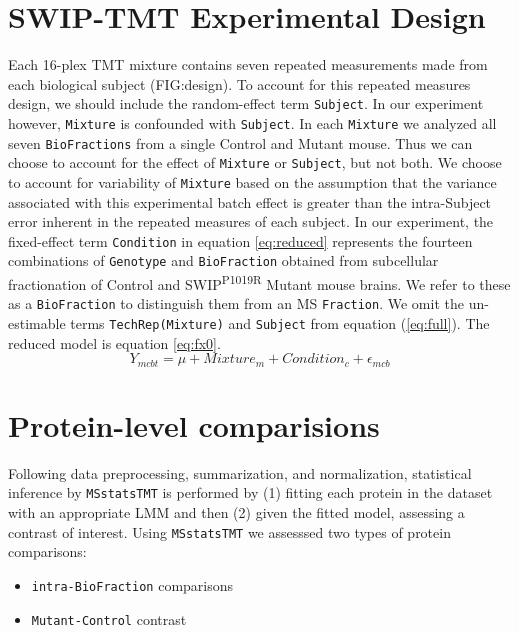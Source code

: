\documentclass[11pt]{elife}
\begin{document}
\section{SWIP-TMT Experimental Design}

Each 16-plex TMT mixture contains seven repeated measurements made from each
biological subject (FIG:design).  To account for this repeated measures
design, we should include the random-effect term \texttt{Subject}.
In our experiment however, \texttt{Mixture} is confounded with \texttt{Subject}.
In each \texttt{Mixture} we analyzed all seven \texttt{BioFractions} from a
single Control and Mutant mouse. Thus we can choose to
account for the effect of \texttt{Mixture} or \texttt{Subject}, but not both. We
choose to account for variability of \texttt{Mixture} based on the assumption
that the variance associated with this experimental batch effect is greater than
the intra-Subject error inherent in the repeated measures of each subject.
In our experiment, the fixed-effect term \texttt{Condition} in equation
\ref{eq:reduced} represents the fourteen combinations of \texttt{Genotype} and
\texttt{BioFraction} obtained from subcellular fractionation of Control and
SWIP\textsuperscript{P1019R} Mutant mouse brains. We refer to these as a
\texttt{BioFraction} to distinguish them from an MS \texttt{Fraction}. 
We omit the un-estimable terms \texttt{TechRep(Mixture)} and \texttt{Subject}
from equation (\ref{eq:full}). The reduced model is equation \ref{eq:fx0}.
\begin{equation}
	\label{eq:fx0}
	Y_{mcbt} = \mu + Mixture_m + Condition_c + \epsilon_{mcb}
\end{equation}


\section{Protein-level comparisions}

Following data preprocessing, summarization, and normalization, statistical
inference by \texttt{MSstatsTMT} is performed by (1) fitting each protein in the
dataset with an appropriate LMM and then (2) given the fitted model, assessing a
contrast of interest. Using \texttt{MSstatsTMT} we assesssed two types of
protein comparisons:
\begin{itemize}
	\item \texttt{intra-BioFraction} comparisons
	\item \texttt{Mutant-Control} contrast
\end{itemize}
\end{document}
